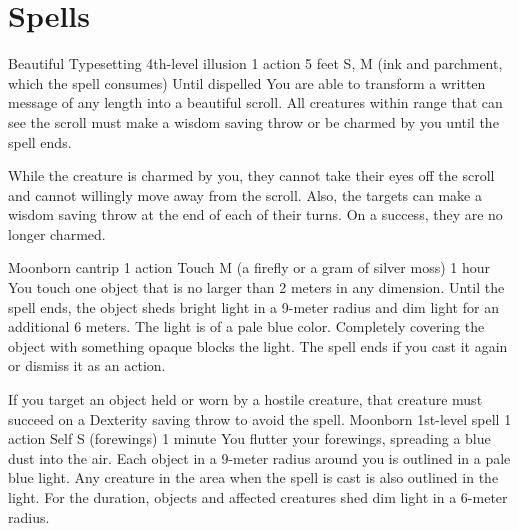 \chapter{Spells}
\DndSpellHeader%
    {Beautiful Typesetting}
    {4th-level illusion}
    {1 action}
    {5 feet}
    {S, M (ink and parchment, which the spell consumes)}
    {Until dispelled}
You are able to transform a written message of any length into a beautiful scroll. All creatures within range that can see the scroll must make a wisdom saving throw or be charmed by you until the spell ends.

While the creature is charmed by you, they cannot take their eyes off the scroll and cannot willingly move away from the scroll. Also, the targets can make a wisdom saving throw at the end of each of their turns. On a success, they are no longer charmed.

    {Moonborn cantrip}
    {1 action}
    {Touch}
    {M (a firefly or a gram of silver moss)}
    {1 hour}
    You touch one object that is no larger than 2 meters in any dimension.
    Until the spell ends, the object sheds bright light in a 9-meter radius and dim light for an additional 6 meters.
    The light is of a pale blue color.
    Completely covering the object with something opaque blocks the light.
    The spell ends if you cast it again or dismiss it as an action.

    If you target an object held or worn by a hostile creature, that creature must succeed on a Dexterity saving throw to avoid the spell.
    {Moonborn 1st-level spell}
    {1 action}
    {Self}
    {S (forewings)}
    {1 minute}
    You flutter your forewings, spreading a blue dust into the air.
    Each object in a 9-meter radius around you is outlined in a pale blue light.
    Any creature in the area when the spell is cast is also outlined in the light.
    For the duration, objects and affected creatures shed dim light in a 6-meter radius.

